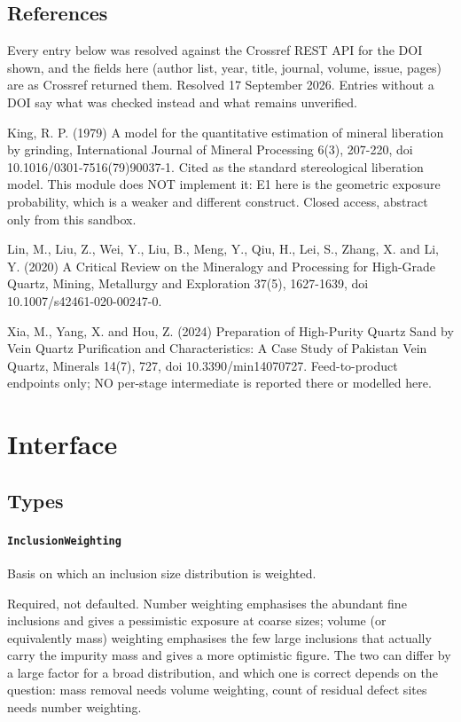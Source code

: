 \documentclass[10pt,a4paper,twoside]{report}
\begin{document}
\subsection*{References}

Every entry below was resolved against the Crossref REST API for the DOI shown, and the fields here (author list, year, title, journal, volume, issue, pages) are as Crossref returned them. Resolved 17 September 2026. Entries without a DOI say what was checked instead and what remains unverified.

King, R. P. (1979) A model for the quantitative estimation of mineral liberation by grinding, International Journal of Mineral Processing 6(3), 207-220, doi 10.1016/0301-7516(79)90037-1. Cited as the standard stereological liberation model. This module does NOT implement it: E1 here is the geometric exposure probability, which is a weaker and different construct. Closed access, abstract only from this sandbox.

Lin, M., Liu, Z., Wei, Y., Liu, B., Meng, Y., Qiu, H., Lei, S., Zhang, X. and Li, Y. (2020) A Critical Review on the Mineralogy and Processing for High-Grade Quartz, Mining, Metallurgy and Exploration 37(5), 1627-1639, doi 10.1007/s42461-020-00247-0.

Xia, M., Yang, X. and Hou, Z. (2024) Preparation of High-Purity Quartz Sand by Vein Quartz Purification and Characteristics: A Case Study of Pakistan Vein Quartz, Minerals 14(7), 727, doi 10.3390/min14070727. Feed-to-product endpoints only; NO per-stage intermediate is reported there or modelled here.

\section{Interface}

\subsection*{Types}

\paragraph{\texttt{InclusionWeighting}}

Basis on which an inclusion size distribution is weighted.

Required, not defaulted. Number weighting emphasises the abundant fine inclusions and gives a pessimistic exposure at coarse sizes; volume (or equivalently mass) weighting emphasises the few large inclusions that actually carry the impurity mass and gives a more optimistic figure. The two can differ by a large factor for a broad distribution, and which one is correct depends on the question: mass removal needs volume weighting, count of residual defect sites needs number weighting.
\end{document}
